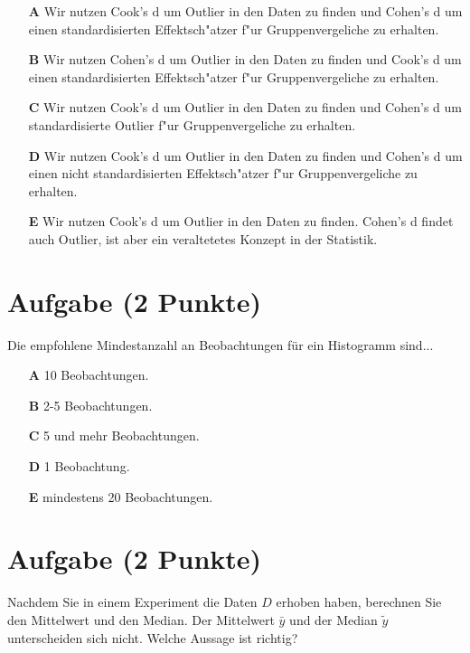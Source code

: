 \documentclass[a4paper, 10pt]{scrartcl}\usepackage[]{graphicx}\usepackage[]{xcolor}
\begin{document}
\begin{enumerate}
\item [\textbf{A} \msquare] Wir nutzen Cook's d um Outlier in den Daten zu finden und Cohen's d um einen standardisierten Effektsch{"a}tzer f{"u}r Gruppenvergeliche zu erhalten.
\item [\textbf{B} \msquare] Wir nutzen Cohen's d um Outlier in den Daten zu finden und Cook's d um einen standardisierten Effektsch{"a}tzer f{"u}r Gruppenvergeliche zu erhalten.
\item [\textbf{C} \msquare] Wir nutzen Cook's d um Outlier in den Daten zu finden und Cohen's d um standardisierte Outlier f{"u}r Gruppenvergeliche zu erhalten.
\item [\textbf{D} \msquare] Wir nutzen Cook's d um Outlier in den Daten zu finden und Cohen's d um einen nicht standardisierten Effektsch{"a}tzer f{"u}r Gruppenvergeliche zu erhalten.
\item [\textbf{E} \msquare] Wir nutzen Cook's d um Outlier in den Daten zu finden. Cohen's d findet auch Outlier, ist aber ein veraltetetes Konzept in der Statistik.
\end{enumerate}

\section{Aufgabe \hfill (2 Punkte)}



Die empfohlene Mindestanzahl an Beobachtungen f{\"u}r ein Histogramm sind...



\begin{enumerate}
\item [\textbf{A} \msquare] 10 Beobachtungen.
\item [\textbf{B} \msquare] 2-5 Beobachtungen.
\item [\textbf{C} \msquare] 5 und mehr Beobachtungen.
\item [\textbf{D} \msquare] 1 Beobachtung.
\item [\textbf{E} \msquare] mindestens 20 Beobachtungen.
\end{enumerate} 

\section{Aufgabe \hfill (2 Punkte)}



Nachdem Sie in einem Experiment die Daten $D$ erhoben haben, berechnen Sie den
Mittelwert und den Median. Der Mittelwert $\bar{y}$ und der Median
$\tilde{y}$ unterscheiden sich nicht. Welche Aussage ist richtig?
\end{document}
